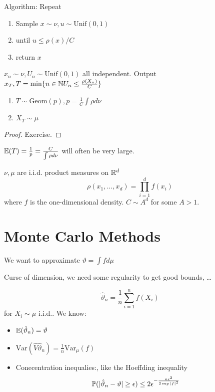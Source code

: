Algorithm: Repeat
\begin{enumerate}
    \item Sample \(x\sim \nu,u\sim\text{Unif}(0,1)\) 
    \item until \(u\leq \rho(x)/C\)
    \item return \(x\)
\end{enumerate}

 \(x_n\sim\nu,U_n\sim\text{Unif}(0,1)\) all independent. Output \(x_T,T=\min\{n\in\mathbb{N} U_n\leq \frac{\rho(X_n)}{C}\}\)

\begin{theorem}
    \begin{enumerate}
        \item \(T\sim \text{Geom}(p),p=\frac{1}{C}\int\rho d\nu\)
        \item \(X_T\sim \mu\)
    \end{enumerate}
\end{theorem}

\begin{proof}
    Exercise.
\end{proof}

 \(\mathbb{E}(T)=\frac{1}{p}=\frac{C}{\int\rho d\nu}\) will often be very large.

\begin{example}
    \(\nu,\mu\) are i.i.d. product measures on \(\mathbb{R}^d\)
    \[\rho(x_1,\dots,x_d)=\prod_{i=1}^d f(x_i)\]
    where \(f\) is the one-dimensional density.
    \(C\sim A^d\) for some \(A>1\).
\end{example}

\section{Monte Carlo Methods}

We want to approximate \(\vartheta=\int fd\mu\)

 Curse of dimension, we need some regularity to get good bounds, \dots

 \[\hat{\vartheta}_n=\frac{1}{n}\sum_{i=1}^n f(X_i)\]
for \(X_i\sim \mu\) i.i.d.. We know:
\begin{itemize}
    \item \(\mathbb{E}(\hat{\vartheta}_n)=\vartheta\) 
    \item \(\text{Var}(\hat{V\vartheta}_n)=\frac{1}{n}\text{Var}_\mu(f)\)
    \item Conecentration inequalies:, like the Hoeffding inequality \[\mathbb{P}(|\hat{\vartheta}_n-\vartheta|\geq \epsilon)\leq 2\epsilon^{-\frac{n\epsilon^2}{2\sup |f|^2}}\]
\end{itemize}

